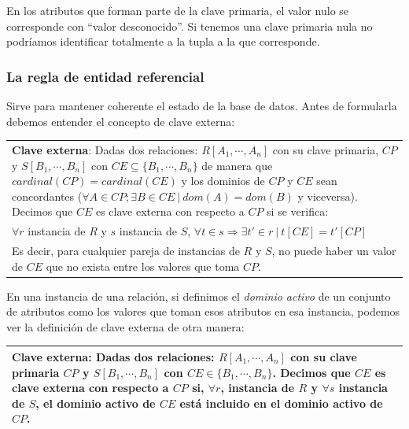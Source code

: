 \documentclass[10pt,a4paper,spanish]{report}
\begin{document}
En los atributos que forman parte de la clave primaria, el valor nulo se corresponde con ``valor desconocido''. Si tenemos una clave primaria nula no podríamos identificar totalmente a la tupla a la que corresponde.

\textcolor[rgb]{1,0.2,0.3}{\subsubsection{La regla de entidad referencial}}
Sirve para mantener coherente el estado de la base de datos. Antes de formularla debemos entender el concepto de clave externa:

\begin{center}
\begin{tabular}{|p{12cm}|}
\hline
\textcolor[rgb]{1,0.2,0.3}{\textbf{Clave externa}}: Dadas dos relaciones: $R[A_1, \cdots, A_n]$ con su clave primaria, $CP$ y $S[B_1,\cdots,B_n]$ con $CE \subseteq \{B_1, \cdots, B_n\}$ de manera que $cardinal(CP)=cardinal(CE)$ y los dominios de $CP$ y $CE$ sean concordantes ($\forall A \in CP; \exists B \in CE ~|~ dom(A)=dom(B)$ y viceversa). Decimos que $CE$ es clave externa con respecto a $CP$ si se verifica: \\
$\forall r$ instancia de $R$ y $s$ instancia de $S$, $\forall t \in s \Longrightarrow \exists t' \in r ~|~ t[CE] = t'[CP]$ \\
Es decir, para cualquier pareja de instancias de $R$ y $S$, no puede haber un valor de $CE$ que no exista entre los valores que toma $CP$. \\
\hline
\end{tabular}
\end{center}

En una instancia de una relación, si definimos el \textcolor[rgb]{1,0.2,0.3}{\textit{dominio activo}} de un conjunto de atributos como los valores que toman esos atributos en esa instancia, podemos ver la definición de clave externa de otra manera:

\begin{center}
\begin{tabular}{|p{12cm}|}
\hline
\textcolor[rgb]{1,0.2,0.3}{\textbf{Clave externa}}: Dadas dos relaciones: $R[A_1,\cdots,A_n]$ con su clave primaria $CP$ y $S[B_1,\cdots,B_n]$ con $CE \in \{B_1,\cdots,B_n\}$. Decimos que $CE$ es clave externa con respecto a $CP$ si, $\forall r$, instancia de $R$ y $\forall s$ instancia de $S$, el dominio activo de $CE$ está incluido en el dominio activo de $CP$.\\
\hline
\end{tabular}  
\end{center}
\end{document}
